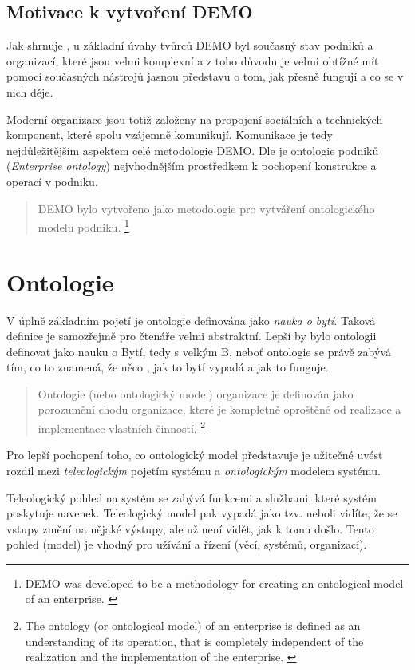 \subsection{Motivace k vytvoření DEMO}
Jak shrnuje \cite{Vejrazkova2013}, u základní úvahy tvůrců DEMO byl současný stav podniků a organizací, které jsou velmi komplexní a z toho důvodu je velmi obtížné mít pomocí současných nástrojů jasnou představu o tom, jak přesně fungují a co se v nich děje.

Moderní organizace jsou totiž založeny na propojení sociálních a technických komponent, které spolu vzájemně komunikují. Komunikace je tedy nejdůležitějším aspektem celé metodologie DEMO. Dle \cite{Dietz2006} je ontologie podniků (\textit{Enterprise ontology}) nejvhodnějším prostředkem k pochopení konstrukce a operací v podniku.

\begin{quote}
DEMO bylo vytvořeno jako metodologie pro vytváření ontologického modelu podniku. \cite{Vejrazkova2012}
\footnote{DEMO was developed to be a methodology for creating an ontological model of an enterprise. \cite{Vejrazkova2012}}
\end{quote}

\section{Ontologie}

V úplně základním pojetí je ontologie definována jako \textit{nauka o bytí.} Taková definice je samozřejmě pro čtenáře velmi abstraktní. Lepší by bylo ontologii definovat jako nauku o Bytí, tedy s velkým B, neboť ontologie se právě zabývá  tím, co to znamená, že něco , jak to bytí vypadá a jak to funguje.

\begin{quote}
Ontologie (nebo ontologický model) organizace je definován jako porozumění chodu organizace, které je kompletně oproštěné od realizace a implementace vlastních činností.
\footnote{The ontology (or ontological model) of an enterprise is defined as an understanding of its operation, that is completely independent of the realization and the implementation of the enterprise. \cite{Dietz2005}}
\end{quote}

Pro lepší pochopení toho, co ontologický model představuje je užitečné uvést rozdíl mezi \textit{teleologickým} pojetím systému a \textit{ontologickým} modelem systému.

Teleologický pohled na systém se zabývá funkcemi a službami, které systém poskytuje navenek. Teleologický model pak vypadá jako tzv.  neboli vidíte, že se vstupy změní na nějaké výstupy, ale už není vidět, jak k tomu došlo. Tento pohled (model) je vhodný pro užívání a řízení (věcí, systémů, organizací).

